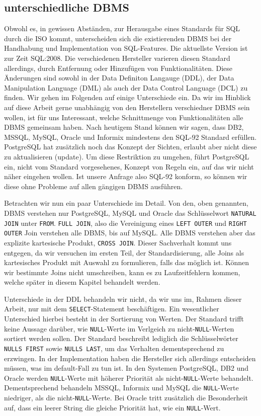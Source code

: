 \subsection{unterschiedliche DBMS}

Obwohl es, in gewissen Abständen, zur Herausgabe eines Standards für SQL durch die ISO kommt, unterscheiden sich die existierenden DBMS bei der Handhabung und Implementation von SQL-Features. Die aktuellste Version ist zur Zeit SQL:2008. Die verschiedenen Hersteller varieren diesen Standard allerdings, durch Entfernung oder Hinzufügen von Funktionalitäten. Diese Änderungen sind sowohl in der Data Definiton Langauge (DDL), der Data Manipulation Language (DML) als auch der Data Control Language (DCL) zu finden. Wir gehen im Folgenden auf einige Unterschiede ein. Da wir im Hinblick auf diese Arbeit gerne unabhängig von den Herstellern verschiedner DBMS sein wollen, ist für uns Interessant, welche Schnittmenge von Funktionalitäten alle DBMS gemeinsam haben. Nach heutigem Stand können wir sagen, dass DB2, MSSQL, MySQL, Oracle und Informix mindestens den SQL-92 Standard erfüllen. PostgreSQL hat zusätzlich noch das Konzept der Sichten, erlaubt aber nicht diese zu aktualisieren (update). Um diese Restriktion zu umgehen, führt PostgreSQL ein, nicht vom Standard vorgesehenes, Konzept von Regeln ein, auf das wir nicht näher eingehen wollen. Ist unsere Anfrage also SQL-92 konform, so können wir diese ohne Probleme auf allen gängigen DBMS ausführen.

Betrachten wir nun ein paar Unterschiede im Detail. Von den, oben genannten, DBMS verstehen nur PostgreSQL, MySQL und Oracle das Schlüsselwort \verb|NATURAL JOIN| unter \verb|FROM|. \verb|FULL JOIN|, also die Vereinigung eines \verb|LEFT OUTER| und \verb|RIGHT OUTER| Join verstehen alle DBMS, bis auf MySQL. Alle DBMS verstehen aber das explizite kartesische  Produkt, \verb|CROSS JOIN|. Dieser Sachverhalt kommt uns entgegen, da wir versuchen im ersten Teil, der Standardisierung, alle Joins als kartesisches Produkt mit Auswahl zu formulieren, falls das möglich ist. Können wir bestimmte Joins nicht umschreiben, kann es zu Laufzeitfehlern kommen, welche später in diesem Kapitel behandelt werden.

Unterschiede in der DDL behandeln wir nicht, da wir uns im, Rahmen dieser Arbeit, nur mit dem \verb|SELECT|-Statement beschäftigen. Ein wesentlicher Unterschied hierbei besteht in der Sortierung von Werten. Der Standard trifft keine Aussage darüber, wie \verb|NULL|-Werte im Verlgeich zu nicht-\verb|NULL|-Werten sortiert werden sollen. Der Standard beschreibt lediglich die Schlüsselwörter \verb|NULLS FIRST| sowie \verb|NULLS LAST|, um das Verhalten dementsprechend zu erzwingen. In der Implementation haben die Hersteller sich allerdings entscheiden müssen, was im default-Fall zu tun ist. In den Systemen PostgreSQL, DB2 und Oracle werden \verb|NULL|-Werte mit höherer Priorität als nicht-\verb|NULL|-Werte behandelt. Dementsprechend behandeln MSSQL, Informix und MySQL die \verb|NULL|-Werte niedriger, als die nicht-\verb|NULL|-Werte. Bei Oracle tritt zusätzlich die Besonderheit auf, dass ein leerer String die gleiche Priorität hat, wie ein \verb|NULL|-Wert. 

